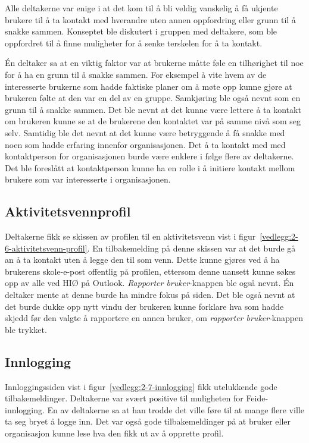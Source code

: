 Alle deltakerne var enige i at det kom til å bli veldig vanskelig å få ukjente brukere til å ta kontakt med hverandre uten annen oppfordring eller grunn til å snakke sammen. Konseptet ble diskutert i gruppen med deltakere, som ble oppfordret til å finne muligheter for å senke terskelen for å ta kontakt. 

Én deltaker sa at en viktig faktor var at brukerne måtte føle en tilhørighet til noe for å ha en grunn til å snakke sammen. For eksempel å vite hvem av de interesserte brukerne som hadde faktiske planer om å møte opp kunne gjøre at brukeren følte at den var en del av en gruppe. Samkjøring ble også nevnt som en grunn til å snakke sammen. Det ble nevnt at det kunne være lettere å ta kontakt om brukeren kunne se at de brukerene den kontaktet var på samme nivå som seg selv. Samtidig ble det nevnt at det kunne være betryggende å få snakke med noen som hadde erfaring innenfor organisasjonen. Det å ta kontakt med med kontaktperson for organisasjonen burde være enklere i følge flere av deltakerne. Det ble foreslått at kontaktperson kunne ha en rolle i å initiere kontakt mellom brukere som var interesserte i organisasjonen.


\subsection{Aktivitetsvennprofil}

Deltakerne fikk se skissen av profilen til en aktivitetsvenn vist i figur~\ref{vedlegg:2-6-aktivitetsvenn-profil}. En tilbakemelding på denne skissen var at det burde gå an å ta kontakt uten å legge den til som venn. Dette kunne gjøres ved å ha brukerens skole-e-post offentlig på profilen, ettersom denne uansett kunne søkes opp av alle ved HIØ på Outlook. {\em  Rapporter bruker}-knappen ble også nevnt. Én deltaker mente at denne burde ha mindre fokus på siden. Det ble også nevnt at det burde dukke opp nytt vindu der brukeren kunne forklare hva som hadde skjedd før den valgte å rapportere en annen bruker, om {\em  rapporter bruker}-knappen ble trykket.


\subsection{Innlogging}

Innloggingssiden vist i figur~\ref{vedlegg:2-7-innlogging} fikk utelukkende gode tilbakemeldinger. Deltakerne var svært positive til muligheten for Feide-innlogging. En av deltakerne sa at han trodde det ville føre til at mange flere ville ta seg bryet å logge inn. Det var også gode tilbakemeldinger på at bruker eller organisasjon kunne lese hva den fikk ut av å opprette profil.


